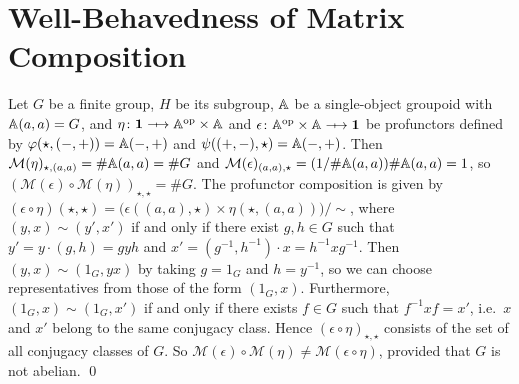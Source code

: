 \section{Well-Behavedness of Matrix Composition}

\newcommand{\MatTrans}[1]{\mathcal{M}({#1})}
\newcommand{\rsem}[1]{(\!|{#1}|\!)}
\newcommand{\SProf}{\mathbf{SProf}}
\newcommand{\WRel}{\mathbf{WRel}}
\newcommand{\Real}{\mathbb{R}}



\tk{to do: define \( \SProf_\omega \)}


\newcommand{\TerminalCategory}{\mathbf{1}}
\begin{example}
    Let \( G \) be a finite group, \( H \) be its subgroup, \( \mathbb{A} \) be a single-object groupoid with \( \mathbb{A}(a, a) = G \), and \( \eta \colon \TerminalCategory \profarrow \Grp^{\op} \times \Grp \) and \( \epsilon \colon \Grp^{\op} \times \Grp \profarrow \TerminalCategory \) be profunctors defined by \( \varphi(\star, ({-}, {+})) = \mathbb{A}({-}, {+}) \) and \( \psi(({+}, {-}), \star) = \mathbb{A}({-}, {+}) \).
    Then \( \MatTrans{\eta}_{\star, (a,a)} = \#\Grp(a,a) = \#G \) and \( \MatTrans{\epsilon}_{(a,a), \star} = (1/\#\Grp(a,a))\#\Grp(a,a) = 1 \), so \( (\MatTrans{\epsilon} \circ \MatTrans{\eta})_{\star, \star} = \#G \).
    The profunctor composition is given by \( (\epsilon \circ \eta)(\star, \star) = \big( \epsilon((a,a), \star) \times \eta(\star, (a,a)) \big) / {\sim} \), where \( (y, x) \sim (y', x') \) if and only if there exist \( g, h \in G \) such that \( y' = y \cdot (g,h) = g y h \) and \( x' = (g^{-1}, h^{-1}) \cdot x = h^{-1} x g^{-1} \).
    Then \( (y, x) \sim (1_G, yx) \) by taking \( g = 1_G \) and \( h = y^{-1} \), so we can choose representatives from those of the form \( (1_G, x) \).
    Furthermore, \( (1_G, x) \sim (1_G, x') \) if and only if there exists \( f \in G \) such that \( f^{-1} x f = x' \), i.e.~\( x \) and \( x' \) belong to the same conjugacy class.
    Hence \( (\epsilon \circ \eta)_{\star, \star} \) consists of the set of all conjugacy classes of \( G \).
    So \( \MatTrans{\epsilon} \circ \MatTrans{\eta} \neq \MatTrans{\epsilon \circ \eta} \), provided that \( G \) is not abelian.
    \qed
\end{example}


